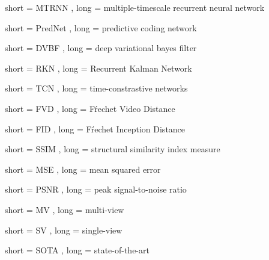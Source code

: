 


{
	short = MTRNN ,
	long = multiple-timescale recurrent neural network
}




{
	short = PredNet ,
	long = predictive coding network
}

{
	short = DVBF ,
	long = deep variational bayes filter
}

{
	short = RKN ,
	long = Recurrent Kalman Network
}

{
	short = TCN ,
	long = time-constrastive networks
}





{
	short = FVD ,
	long = Fŕechet Video Distance
}

{
	short = FID ,
	long = Fŕechet Inception Distance
}

{
	short = SSIM ,
	long = structural similarity index measure
}

{
	short = MSE ,
	long = mean squared error
}

{
	short = PSNR ,
	long = peak signal-to-noise ratio
}

{
	short = MV ,
	long = multi-view
}

{
	short = SV ,
	long = single-view
}

{
	short = SOTA ,
	long = state-of-the-art
}
